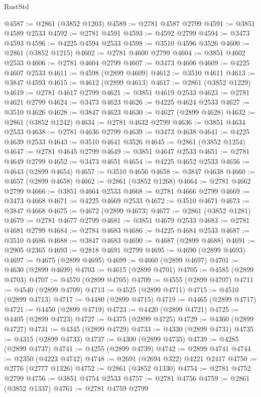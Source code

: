 \begin{lexlean}{RustStd}
\begin{coremodule}
@4587 := @2861 (@3852 @1203)
@4589 := @2781 @4587 @2799
@4591 := @3851 @4589 @2533
@4592 := @2781 @4591
@4593 := @4592 @2799
@4594 := @3473 @4593
@4596 := @4225 @4594 @2533
@4598 := @3510 @4596 @3526
@4600 := @2861 (@3852 @1215)
@4602 := @2781 @4600 @2799
@4604 := @3851 @4602 @2533
@4606 := @2781 @4604 @2799
@4607 := @3473 @4606
@4609 := @4225 @4607 @2533
@4611 := @4598 (@2899 @4609)
@4612 := @3510 @4611
@4613 := @3847 @4593
@4615 := @4612 (@2899 @4613)
@4617 := @2861 (@3852 @1229)
@4619 := @2781 @4617 @2799
@4621 := @3851 @4619 @2533
@4623 := @2781 @4621 @2799
@4624 := @3473 @4623
@4626 := @4225 @4624 @2533
@4627 := @3510 @4626
@4628 := @3847 @4623
@4630 := @4627 (@2899 @4628)
@4632 := @2861 (@3852 @1242)
@4634 := @2781 @4632 @2799
@4636 := @3851 @4634 @2533
@4638 := @2781 @4636 @2799
@4639 := @3473 @4638
@4641 := @4225 @4639 @2533
@4643 := @3510 @4641 @3526
@4645 := @2861 (@3852 @1254)
@4647 := @2781 @4645 @2799
@4649 := @3851 @4647 @2533
@4651 := @2781 @4649 @2799
@4652 := @3473 @4651
@4654 := @4225 @4652 @2533
@4656 := @4643 (@2899 @4654)
@4657 := @3510 @4656
@4658 := @3847 @4638
@4660 := @4657 (@2899 @4658)
@4662 := @2861 (@3852 @1268)
@4664 := @2781 @4662 @2799
@4666 := @3851 @4664 @2533
@4668 := @2781 @4666 @2799
@4669 := @3473 @4668
@4671 := @4225 @4669 @2533
@4672 := @3510 @4671
@4673 := @3847 @4668
@4675 := @4672 (@2899 @4673)
@4677 := @2861 (@3852 @1281)
@4679 := @2781 @4677 @2799
@4681 := @3851 @4679 @2533
@4683 := @2781 @4681 @2799
@4684 := @2784 @4683
@4686 := @4225 @4684 @2533
@4687 := @3510 @4686
@4688 := @3847 @4683
@4690 := @4687 (@2899 @4688)
@4691 := @2905 @2365
@4693 := @2818 @4691 @2799
@4695 := @4690 (@2899 @4693)
@4697 := @4675 (@2899 @4695)
@4699 := @4660 (@2899 @4697)
@4701 := @4630 (@2899 @4699)
@4703 := @4615 (@2899 @4701)
@4705 := @4585 (@2899 @4703)
@4707 := @4570 (@2899 @4705)
@4709 := @4555 (@2899 @4707)
@4711 := @4540 (@2899 @4709)
@4713 := @4525 (@2899 @4711)
@4715 := @4510 (@2899 @4713)
@4717 := @4480 (@2899 @4715)
@4719 := @4465 (@2899 @4717)
@4721 := @4450 (@2899 @4719)
@4723 := @4420 (@2899 @4721)
@4725 := @4405 (@2899 @4723)
@4727 := @4375 (@2899 @4725)
@4729 := @4360 (@2899 @4727)
@4731 := @4345 (@2899 @4729)
@4733 := @4330 (@2899 @4731)
@4735 := @4315 (@2899 @4733)
@4737 := @4300 (@2899 @4735)
@4739 := @4285 (@2899 @4737)
@4741 := @4255 (@2899 @4739)
@4742 := @2899 @4741
@4744 := @2350 (@4223 @4742)
@4748 := @2691 (@2694 @322) @4221 @2417
@4750 := @2776 (@2777 @1326)
@4752 := @2861 (@3852 @1330)
@4754 := @2781 @4752 @2799
@4756 := @3851 @4754 @2533
@4757 := @2781 @4756
@4759 := @2861 (@3852 @1337)
@4761 := @2781 @4759 @2799

\end{coremodule}
\end{lexlean}
